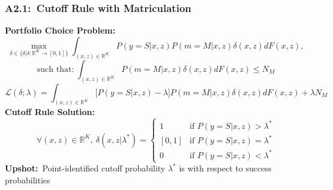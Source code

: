 \documentclass[12pt, aspectratio=169]{beamer}
\begin{document}
\begin{frame}[label=crwm]
\frametitle{A2.1:\ Cutoff Rule with Matriculation}
\textbf{Portfolio Choice Problem:}
\begin{equation*}
\max_{\delta\in\{\delta|\delta: \mathbb R^K\rightarrow[0,1]\}}\int_{(x,z)\in\mathbb R^K}P(y=S|x,z)P(m=M|x,z)\delta(x,z)dF(x,z),
\end{equation*}
\begin{equation*}
\text{such that:} \: \int_{(x,z)\in\mathbb R^K}P(m=M|x,z)\delta(x,z)dF(x,z)\leq N_M
\end{equation*}
\begin{equation*}
\mathcal L(\delta;\lambda) = \int_{(x,z)\in\mathbb R^K}\big[P(y=S|x,z)-\lambda\big]P(m=M|x,z)\delta(x,z)dF(x,z)+\lambda N_M
\end{equation*}
\textbf{Cutoff Rule Solution:}
\vspace{-7.5pt}
\begin{equation*}
\forall (x,z)\in\mathbb R^K, \: \delta(x,z|\lambda^*)=\begin{cases}
1 & \text{if } P(y=S|x,z)>\lambda^* \\
[0,1] & \text{if } P(y=S|x,z)=\lambda^* \\
0 & \text{if } P(y=S|x,z)<\lambda^*
\end{cases}
\end{equation*}
\textbf{Upshot:}\ Point-identified cutoff probability $\lambda^*$ is with respect to success probabilities
\hyperlink{pcwm}{}
\end{frame}
\end{document}
